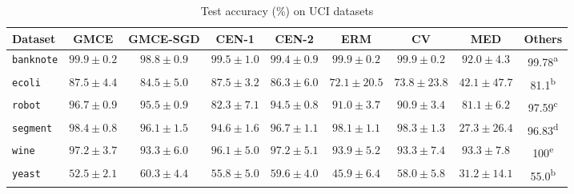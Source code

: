 \documentclass[twoside]{article}
\begin{document}
	\begin{table*}[t]
		\caption{Test accuracy (\%) on UCI datasets}
		\label{tab:uci_experiments}
		\centering
		\begin{tabular}{lcccccccc}	
			Dataset & G\gls{MCE} & G\gls{MCE}-SGD & \gls{CEN}-1 & \gls{CEN}-2 & ERM & CV & MED & Others \\
			\midrule
			\texttt{banknote} & $\mathbf{99.9 \pm 0.2}$ & $98.8 \pm 0.9$ & $99.5 \pm 1.0$ & $99.4 \pm 0.9$ & $\mathbf{99.9 \pm 0.2}$ & $\mathbf{99.9 \pm 0.2}$ & $92.0 \pm 4.3$ & 99.78\textsuperscript{a} \\
			\texttt{ecoli} & $\mathbf{87.5 \pm 4.4}$ & $84.5 \pm 5.0$ & $\mathbf{87.5 \pm 3.2}$ & $86.3 \pm 6.0$ & $72.1 \pm 20.5$ & $73.8 \pm 23.8$ & $42.1 \pm 47.7$ & 81.1\textsuperscript{b} \\
			\texttt{robot} & $\mathbf{96.7 \pm 0.9}$ & $95.5 \pm 0.9$ & $82.3 \pm 7.1$ & $94.5 \pm 0.8$ & $91.0 \pm 3.7$ & $90.9 \pm 3.4$ & $81.1 \pm 6.2$ & 97.59\textsuperscript{c} \\
			\texttt{segment} & $\mathbf{98.4 \pm 0.8}$ & $96.1 \pm 1.5$ & $94.6 \pm 1.6$ & $96.7 \pm 1.1$ & $98.1 \pm 1.1$ & $98.3 \pm 1.3$ & $27.3 \pm 26.4$ & 96.83\textsuperscript{d} \\
			\texttt{wine} & $\mathbf{97.2 \pm 3.7}$ & $93.3 \pm 6.0$ & $96.1 \pm 5.0$ & $97.2 \pm 5.1$ & $93.9 \pm 5.2$ & $93.3 \pm 7.4$ & $93.3 \pm 7.8$ & 100\textsuperscript{e} \\
			\texttt{yeast} & $52.5 \pm 2.1$ & $\mathbf{60.3 \pm 4.4}$ & $55.8 \pm 5.0$ & $59.6 \pm 4.0$ & $45.9 \pm 6.4$ & $58.0 \pm 5.8$ & $31.2 \pm 14.1$ & 55.0\textsuperscript{b} \\
		\end{tabular}
	\end{table*}
	
\end{document}
